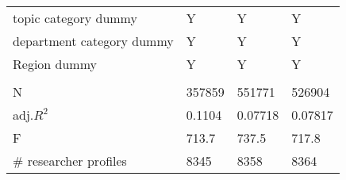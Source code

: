 \documentclass[
]{article}
\begin{document}
\begin{table}
\begin{tabular}[t]{llll}
\hspace{1em}topic category dummy & Y & Y & Y\\
\hspace{1em}department category dummy & Y & Y & Y\\
\hspace{1em}Region dummy & Y & Y & Y\\
\addlinespace[0.3em]
\hline
\multicolumn{4}{l}{\textbf{ }}\\
\hspace{1em}N & 357859 & 551771 & 526904\\
\hspace{1em}adj.$R^2$ & 0.1104 & 0.07718 & 0.07817\\
\hspace{1em}F & 713.7 & 737.5 & 717.8\\
\hspace{1em}\# researcher profiles & 8345 & 8358 & 8364\\
\bottomrule
\end{tabular}
\end{table}
\end{document}
